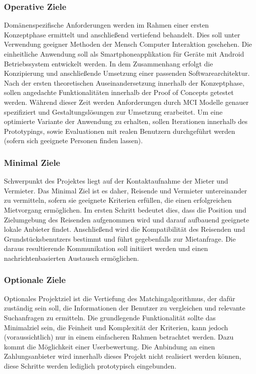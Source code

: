 \subsubsection{Operative Ziele}
Domänenspezifische Anforderungen werden im Rahmen einer ersten Konzeptphase ermittelt und anschließend vertiefend behandelt. Dies soll unter Verwendung geeigner Methoden der Mensch Computer Interaktion geschehen. Die einheitliche Anwendung soll als Smartphoneapplikation für Geräte mit Android Betriebssystem entwickelt werden. In dem Zusammenhang erfolgt die Konzipierung und anschließende Umsetzung einer passenden Softwarearchitektur. Nach der ersten theoretischen Auseinandersetzung innerhalb der Konzeptphase, sollen angedachte Funktionalitäten innerhalb der Proof of Concepts getestet werden. Während dieser Zeit werden Anforderungen durch MCI Modelle genauer spezifiziert und Gestaltungslösungen zur Umsetzung erarbeitet. Um eine optimierte Variante der Anwendung zu erhalten, sollen Iterationen innerhalb des Prototypings, sowie Evaluationen mit realen Benutzern durchgeführt werden (sofern sich geeignete Personen finden lassen). 

\subsubsection{Minimal Ziele}
Schwerpunkt des Projektes liegt auf der Kontaktaufnahme der Mieter und Vermieter. Das Minimal Ziel ist es daher, Reisende und Vermieter untereinander zu vermitteln, sofern sie geeignete Kriterien erfüllen, die einen erfolgreichen Mietvorgang ermöglichen. Im ersten Schritt bedeutet dies, dass die Position und Zielumgebung des Reisenden aufgenommen wird und darauf aufbauend geeignete lokale Anbieter findet. Anschließend wird die Kompatibilität des Reisenden und Grundstücksbenutzers bestimmt und führt gegebenfalls zur Mietanfrage. Die daraus resultierende Kommunikation soll initiiert werden und einen nachrichtenbasierten Austausch ermöglichen.

\subsubsection{Optionale Ziele}
Optionales Projektziel ist die Vertiefung des Matchingalgorithmus, der dafür zuständig sein soll, die Informationen der Benutzer zu vergleichen und  relevante Suchanfragen zu ermitteln. Die grundlegende Funktionalität sollte das Minimalziel sein, die Feinheit und Komplexität der Kriterien, kann jedoch (voraussichtlich) nur in einem einfacheren Rahmen betrachtet werden.
Dazu kommt die Möglichkeit einer Userbewertung. Die Anbindung an einen Zahlungsanbieter wird innerhalb dieses Projekt nicht realisiert werden können, diese Schritte werden lediglich prototypisch eingebunden.
